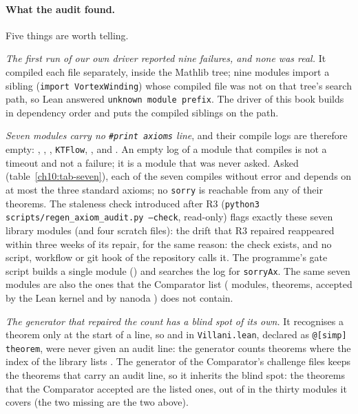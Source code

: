 \paragraph{What the audit found.} Five things are worth telling.

\emph{The first run of our own driver reported nine failures, and none was real.} It compiled each file separately, inside the Mathlib tree; nine
modules import a sibling (\texttt{import VortexWinding}) whose compiled file was not on that tree's search path, so Lean answered \texttt{unknown
module prefix}. The driver of this book builds in dependency order and puts the compiled siblings on the path.

\emph{Seven modules carry no \texttt{\#print axioms} line}, and their compile logs are therefore empty: ,
, , \texttt{KTFlow}, ,  and
. An empty log of a module that compiles is not a timeout and not a failure; it is a module that was never asked. Asked (table~\ref{ch10:tab-seven}), each of the seven
compiles without error and depends on at most the three standard axioms; no \texttt{sorry} is reachable from any of their \NxAuditSevenThm{} theorems.
The staleness check introduced after R3 (\texttt{python3 scripts/regen\_axiom\_audit.py --check}, read-only) flags exactly these seven library modules (and four scratch files): the drift that R3
repaired reappeared within three weeks of its repair, for the same reason: the check exists, and no script, workflow or git hook of the repository calls it. The programme's gate
script  builds a single module () and searches the log for \texttt{sorryAx}. The same seven
modules are also the ones that the Comparator list (\NxLibCmpModules{} modules, \NxLibCmpThm{} theorems, accepted by the Lean kernel and by
nanoda \cite{LeanComparator,Nanoda}) does not contain.


\emph{The generator that repaired the count has a blind spot of its own.} It recognises a theorem only at the start of a line, so
 and  in \texttt{Villani.lean}, declared as \texttt{@[simp] theorem}, were never given an
audit line: the generator counts \NxLibGenThm{} theorems where the index of the library lists \NxLibThm{}. The generator of the Comparator's challenge files keeps the
theorems that carry an audit line, so it inherits the blind spot: the \NxLibCmpThm{} theorems that the Comparator accepted are the \NxLibCmpGen{} listed ones, out of
\NxLibCmpIdx{} in the thirty modules it covers (the two missing are the two above). \NxVillaniSimp

